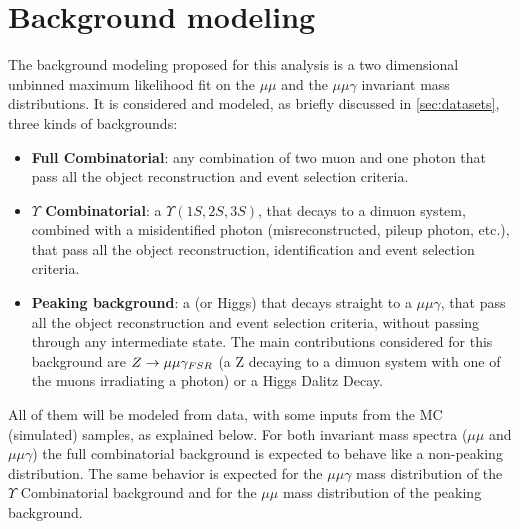 \clearpage
\section{Background modeling} \label{sec:background_modeling}

The background modeling proposed for this analysis is a two dimensional unbinned maximum likelihood fit on the $\mu\mu$ and the $\mu\mu\gamma$ invariant mass distributions. It is considered and modeled, as briefly discussed in \ref{sec:datasets}, three kinds of backgrounds:


\begin{itemize}
  \item \textbf{Full Combinatorial}: any combination of two muon and one photon that pass all the object reconstruction and event selection criteria.
  \item \textbf{$\Upsilon$ Combinatorial}: a $\Upsilon(1S,2S,3S)$, that decays to a dimuon system, combined with a misidentified photon (misreconstructed, pileup photon, etc.), that pass all the object reconstruction, identification and event selection criteria.
  \item \textbf{Peaking background}: a \Z (or Higgs) that decays straight to a $\mu\mu\gamma$, that pass all the object reconstruction and event selection criteria, without passing through any intermediate state. The main contributions considered for this background are $Z \rightarrow \mu\mu\gamma_{\small{FSR}}$ (a Z decaying to a dimuon system with one of the muons irradiating a photon) or a Higgs Dalitz Decay.
\end{itemize}

All of them will be modeled from data, with some inputs from the MC (simulated) samples, as explained below. For both invariant mass spectra ($\mu\mu$ and $\mu\mu\gamma$) the full combinatorial background is expected to behave like a non-peaking distribution. The same behavior is expected for the $\mu\mu\gamma$ mass distribution of the $\Upsilon$ Combinatorial background and for the $\mu\mu$ mass distribution of the peaking background. 

